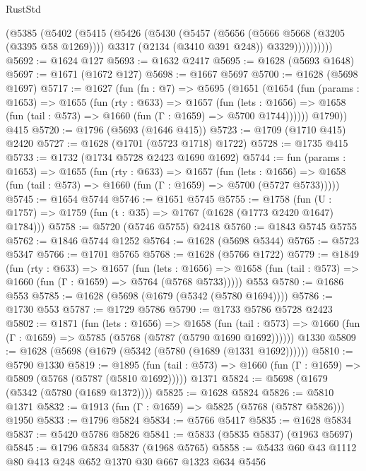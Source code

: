 \begin{lexlean}{RustStd}
\begin{coremodule}
            (@5385
              (@5402
                (@5415
                  (@5426
                    (@5430
                      (@5457
                        (@5656 (@5666 @5668 (@3205 (@3395 @58 @1269))))
                        @3317
                        (@2134 (@3410 @391 @248))
                        @3329))))))))))
@5692 := @1624 @127
@5693 := @1632 @2417
@5695 := @1628 (@5693 @1648)
@5697 := @1671 (@1672 @127)
@5698 := @1667 @5697
@5700 := @1628 (@5698 @1697)
@5717 := @1627
    (fun (fn : @7) =>
    @5695
      (@1651
        (@1654
          (fun (params : @1653) =>
          @1655
            (fun (rty : @633) =>
            @1657
              (fun (lets : @1656) =>
              @1658 (fun (tail : @573) => @1660 (fun (Γ : @1659) => @5700 @1744))))))
        @1790))
    @415
@5720 := @1796 (@5693 (@1646 @415))
@5723 := @1709 (@1710 @415) @2420
@5727 := @1628 (@1701 (@5723 @1718) @1722)
@5728 := @1735 @415
@5733 := @1732 (@1734 @5728 @2423 @1690 @1692)
@5744 := fun (params : @1653) =>
  @1655
    (fun (rty : @633) =>
    @1657
      (fun (lets : @1656) =>
      @1658 (fun (tail : @573) => @1660 (fun (Γ : @1659) => @5700 (@5727 @5733)))))
@5745 := @1654 @5744
@5746 := @1651 @5745
@5755 := @1758 (fun (U : @1757) => @1759 (fun (t : @35) => @1767 (@1628 (@1773 @2420 @1647) @1784)))
@5758 := @5720 (@5746 @5755) @2418
@5760 := @1843 @5745 @5755
@5762 := @1846 @5744 @1252
@5764 := @1628 (@5698 @5344)
@5765 := @5723 @5347
@5766 := @1701 @5765
@5768 := @1628 (@5766 @1722)
@5779 := @1849
    (fun (rty : @633) =>
    @1657
      (fun (lets : @1656) =>
      @1658 (fun (tail : @573) => @1660 (fun (Γ : @1659) => @5764 (@5768 @5733)))))
    @553
@5780 := @1686 @553
@5785 := @1628 (@5698 (@1679 (@5342 (@5780 @1694))))
@5786 := @1730 @553
@5787 := @1729 @5786
@5790 := @1733 @5786 @5728 @2423
@5802 := @1871
    (fun (lets : @1656) =>
    @1658
      (fun (tail : @573) => @1660 (fun (Γ : @1659) => @5785 (@5768 (@5787 (@5790 @1690 @1692))))))
    @1330
@5809 := @1628 (@5698 (@1679 (@5342 (@5780 (@1689 (@1331 @1692))))))
@5810 := @5790 @1330
@5819 := @1895
    (fun (tail : @573) => @1660 (fun (Γ : @1659) => @5809 (@5768 (@5787 (@5810 @1692)))))
    @1371
@5824 := @5698 (@1679 (@5342 (@5780 (@1689 @1372))))
@5825 := @1628 @5824
@5826 := @5810 @1371
@5832 := @1913 (fun (Γ : @1659) => @5825 (@5768 (@5787 @5826))) @1950
@5833 := @1796 @5824
@5834 := @5766 @5417
@5835 := @1628 @5834
@5837 := @5420 @5786 @5826
@5841 := @5833 (@5835 @5837) (@1963 @5697)
@5845 := @1796 @5834 @5837 (@1968 @5765)
@5858 := @5433 @60 @43 @1112 @80 @413 @248 @652 @1370 @30 @667 @1323 @634 @5456

\end{coremodule}
\end{lexlean}
